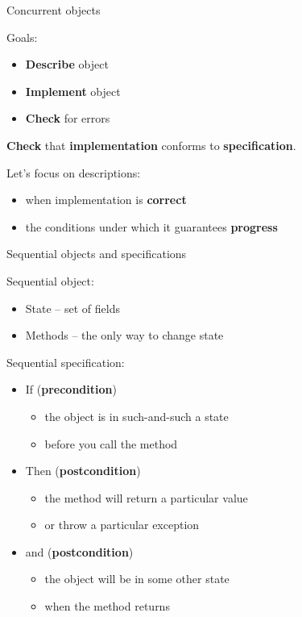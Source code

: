 \begin{frame}{Concurrent objects}

Goals:
\begin{itemize}
  \item \textbf{Describe} object
  \item \textbf{Implement} object
  \item \textbf{Check} for errors
\end{itemize}

\pause
\textbf{Check} that \textbf{implementation} conforms to \textbf{specification}.

\pause
Let's focus on descriptions: \pause
\begin{itemize}
  \item when implementation is \textbf{correct}
  \item the conditions under which it guarantees \textbf{progress}
\end{itemize}

\end{frame}


\begin{frame}[t]{Sequential objects and specifications}

Sequential object:
\begin{itemize}
  \item State -- set of fields
  \item Methods -- the only way to change state  
\end{itemize}

\pause 

Sequential specification:
\begin{itemize}
  \item If (\textbf{precondition}) 
  \begin{itemize}
    \item the object is in such-and-such a state
    \item before you call the method
  \end{itemize}

  \item Then (\textbf{postcondition})
  \begin{itemize}
    \item the method will return a particular value
    \item or throw a particular exception
  \end{itemize}

  \item and (\textbf{postcondition})
  \begin{itemize}
    \item the object will be in some other state
    \item when the method returns
  \end{itemize}
\end{itemize}
\end{frame}

